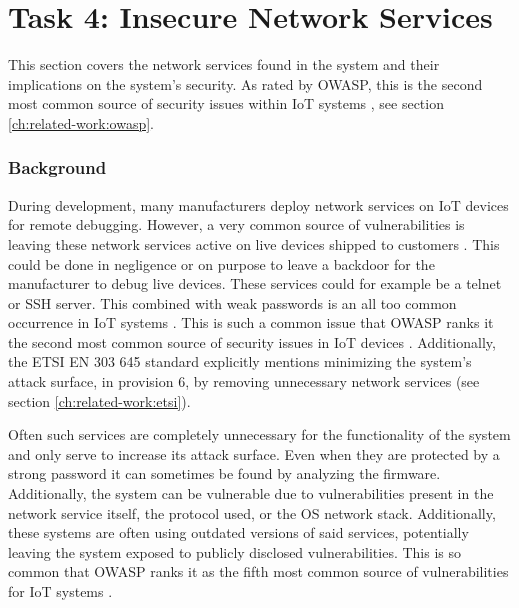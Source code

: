 \section{Task 4: Insecure Network Services} \label{ch:pentesting:network-services}
This section covers the network services found in the system and their implications on the system's security. As rated by OWASP, this is the second most common source of security issues within IoT systems \cite{owasp-iot-top10}, see section \ref{ch:related-work:owasp}.

\subsubsection{Background}
During development, many manufacturers deploy network services on IoT devices for remote debugging. However, a very common source of vulnerabilities is leaving these network services active on live devices shipped to customers \cite{owasp-iot-top10}. This could be done in negligence or on purpose to leave a backdoor for the manufacturer to debug live devices. These services could for example be a telnet or SSH server. This combined with weak passwords is an all too common occurrence in IoT systems \cite{understanding-mirai}. This is such a common issue that OWASP ranks it the second most common source of security issues in IoT devices \cite{owasp-iot-top10}. Additionally, the ETSI EN 303 645 standard explicitly mentions minimizing the system's attack surface, in provision 6, by removing unnecessary network services \cite{etsi-iot-standard} (see section \ref{ch:related-work:etsi}).

Often such services are completely unnecessary for the functionality of the system and only serve to increase its attack surface. Even when they are protected by a strong password it can sometimes be found by analyzing the firmware. Additionally, the system can be vulnerable due to vulnerabilities present in the network service itself, the protocol used, or the OS network stack. Additionally, these systems are often using outdated versions of said services, potentially leaving the system exposed to publicly disclosed vulnerabilities. This is so common that OWASP ranks it as the fifth most common source of vulnerabilities for IoT systems \cite{owasp-iot-top10}.

